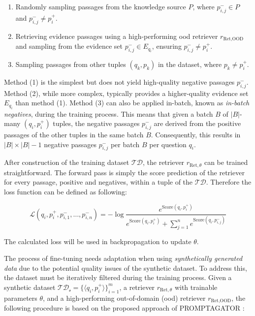 \begin{enumerate}
    \item Randomly sampling passages from the knowledge source $P$, where $p_{i,j}^- \in P$ and $p_{i,j}^- \neq p_i^+$.
    \item Retrieving evidence passages using a high-performing \gls{ood} retriever $r_{\text{Ret},\text{OOD}}$ and sampling from the evidence set $p_{i,j}^- \in E_{q_i}$, ensuring $p_{i,j}^- \neq p_i^+$.
    \item Sampling passages from other tuples $(q_k,p_k)$ in the dataset, where $p_k \neq p_i^+$.
\end{enumerate}

Method (1) is the simplest but does not yield high-quality negative passages $p_{i,j}^-$. Method (2), while more complex, typically provides a higher-quality evidence set $E_{q_i}$ than method (1). Method (3) can also be applied in-batch, known as \textit{in-batch negatives}, during the training process. This means that given a batch $B$ of $|B|$-many $(q_i,p_i^+)$ tuples, the negative passages $p_{i,j}^-$ are derived from the positive passages of the other tuples in the same batch $B$. Consequently, this results in $|B| \times |B| - 1$ negative passages $p_{i,j}^-$ per batch $B$ per question $q_i$.

After construction of the training dataset $\mathcal{TD}$, the retriever $r_{\text{Ret}, \theta}$ can be trained straightforward. The forward pass is simply the score prediction of the retriever for every passage, positive and negatives, within a tuple of the $\mathcal{TD}$. Therefore the loss function can be defined as following:

\begin{equation}
    \mathcal{L}(q_i, p_i^+,p_{i,1}^-, \dots, p_{i,n}^-) = -\log \frac{e^{\text{Score}(q_i,p_i^+)}}{e^{\text{Score}(q_i,p_i^+)} + \sum_{j=1}^{n} e^{\text{Score}(q_i,p_{i,j}^-)}}
\end{equation}

The calculated loss will be used in backpropagation to update $\theta$.

The process of fine-tuning needs adaptation when using \textit{synthetically generated data} due to the potential quality issues of the synthetic dataset. To address this, the dataset must be iteratively filtered during the training process. Given a synthetic dataset $\mathcal{TD_s} = \{\langle q_i, p_i^+\rangle\}_{i=1}^m$, a retriever $r_{\text{Ret}, \theta}$ with trainable parameters $\theta$, and a high-performing out-of-domain (\gls{ood}) retriever $r_{\text{Ret},\text{OOD}}$, the following procedure is based on the proposed approach of PROMPTAGATOR \cite{dai_promptagator_2022}:

